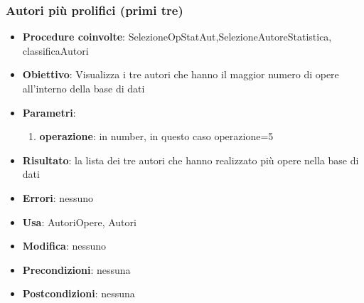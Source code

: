 \subsubsection{Autori più prolifici (primi tre)}
\begin{itemize}
	\item \textbf{Procedure coinvolte}: SelezioneOpStatAut,SelezioneAutoreStatistica, classificaAutori
	\item \textbf{Obiettivo}: Visualizza i tre autori che hanno il maggior numero di opere
	all'interno della base di dati
	\item \textbf{Parametri}:
	\begin{enumerate}
		\item \textbf{operazione}: in number, in questo caso operazione=5
	\end{enumerate}
	\item \textbf{Risultato}: la lista dei tre autori che hanno realizzato più opere nella base di dati
	\item \textbf{Errori}: nessuno
	\item \textbf{Usa}: AutoriOpere, Autori
	\item \textbf{Modifica}: nessuno
	\item \textbf{Precondizioni}: nessuna
	\item \textbf{Postcondizioni}: nessuna
\end{itemize}
